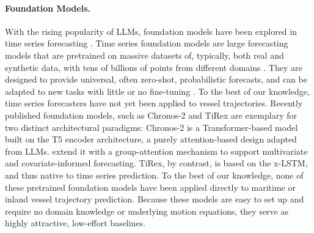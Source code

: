 \paragraph{Foundation Models.}

With the rising popularity of \acp{LLM}, 
foundation models have been explored in time series forecasting \parencite{timeseriesreview}. 
Time series foundation models %
are large forecasting models that are pretrained on massive datasets of, typically, both real and synthetic data, with tens of billions of points from different domains \parencite{timeseriesreview}.  %
They are designed to provide universal, often zero‑shot, probabilistic forecasts, and can be adapted to new tasks with little or no fine-tuning \parencite{ansari2025chronos2}. 
To the best of our knowledge, time series forecasters have not yet been applied to vessel trajectories. %
Recently published foundation models, such as Chronos-2 \parencite{ansari2025chronos2} and TiRex \parencite{auer2025tirexzeroshotforecastinglongtrex} are exemplary for two distinct architectural paradigms:  Chronos-2 is a Transformer-based model built on the T5 %
encoder architecture, a purely attention-based design adapted from \acp{LLM}.
\citeauthor{ansari2025chronos2} extend it with a group-attention mechanism to support multivariate and covariate-informed forecasting.
TiRex, by contrast, is based on the \ac{x-LSTM}, and thus native to time series prediction.  
To the best of our knowledge, none of these pretrained foundation models have been applied directly to maritime or inland vessel trajectory prediction.
Because these models are easy to set up and require no domain knowledge or underlying motion equations, they serve as highly attractive, low-effort baselines. 


